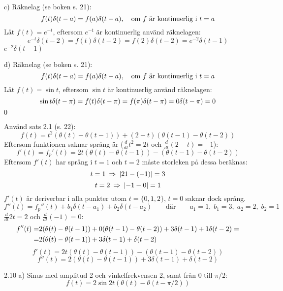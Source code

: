 \begin{task}{c)}
	Räknelag (se boken s. 21):
	\[f(t)\delta(t-a)=f(a)\delta(t-a), \quad \text{om } f \text{ är kontinuerlig i }t=a\]
	Låt $f(t)=e^{-t}$, eftersom $e^{-t}$ är kontinuerlig använd räknelagen:
	\[e^{-t}\delta(t-2)=
	f(t)\delta(t-2)=
	f(2)\delta(t-2)=
	e^{-2}\delta(t-1)\]
	\ans $e^{-2}\delta(t-1)$
\end{task}

\begin{task}{d)}
	Räknelag (se boken s. 21):
	\[f(t)\delta(t-a)=f(a)\delta(t-a), \quad \text{om } f \text{ är kontinuerlig i }t=a\]
	Låt $f(t)=\sin t$, eftersom $\sin t$ är kontinuerlig använd räknelagen:
	\[\sin t\delta(t-\pi)=
	f(t)\delta(t-\pi)=
	f(\pi)\delta(t-\pi)=
	0\*\delta(t-\pi)=
	0\]
	\ans $0$
\end{task}

\begin{task}{2.9}
	Använd sats 2.1 (s. 22):
	\[f(t)= t^2(\theta(t)-\theta(t-1))+(2-t)(\theta(t-1)-\theta(t-2))\]
	Eftersom funktionen saknar språng är ($\frac{d}{dt}t^2=2t$ och $\frac{d}{dt}(2-t)=-1$):
	\[f'(t)=f_p'(t)=2t(\theta(t)-\theta(t-1))-(\theta(t-1)-\theta(t-2))\]
	Eftersom $f'(t)$ har språng i $t=1$ och $t=2$ måste storleken på dessa beräknas:
	\[t=1 \ra \abs{2\*1-(-1)}=3\]
	\[t=2 \ra \abs{-1-0}=1\]
	$f'(t)$ är deriverbar i alla punkter utom $t=\{0,1,2\}$, $t=0$ saknar dock språng.
	\[f''(t)=f_p''(t)+b_1\delta(t-a_1)+b_2\delta(t-a_2) \qquad\text{där}\qquad a_1=1,\;b_1=3,\;a_2=2,\;b_2=1\]
	$\frac{d}{dt}2t=2$ och $\frac{d}{dt}(-1)=0$:
	\begin{align*}
	f''(t)=
	&2(\theta(t)-\theta(t-1))+0\*(\theta(t-1)-\theta(t-2))+3\delta(t-1)+1\*\delta(t-2)= \\ =
	&2(\theta(t)-\theta(t-1))+3\delta(t-1)+\delta(t-2)
	\end{align*}
	\ans 
	\[f'(t)=2t(\theta(t)-\theta(t-1))-(\theta(t-1)-\theta(t-2))\]
	\[f''(t)=2(\theta(t)-\theta(t-1))+3\delta(t-1)+\delta(t-2)\]
\end{task}

\begin{task}{2.10 a)}
	Sinus med amplitud 2 och vinkelfrekvensen 2, samt från 0 till $\pi/2$:
	\[f(t)=2\sin 2t(\theta(t)-\theta(t-\pi/2))\]
\end{task}